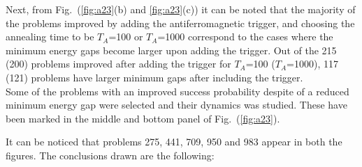 \documentclass[../main.tex]{subfiles}
\begin{document}
Next, from Fig.~(\ref{fig:a23}(b) and \ref{fig:a23}(c)) it can be noted that the majority of the problems improved by adding the antiferromagnetic trigger, and choosing the annealing time to be $T_A$=100 or $T_A$=1000 correspond to the cases where the minimum energy gaps become larger upon adding the trigger. Out of the 215 (200) problems improved after adding the trigger for $T_A$=100 ($T_A$=1000), 117 (121) problems have larger minimum gaps after including the trigger.\\
Some of the problems with an improved success probability despite of a reduced minimum energy gap were selected and their dynamics was studied. These have been marked in the middle and bottom panel of Fig.~(\ref{fig:a23}). 

It can be noticed that problems 275, 441, 709, 950 and 983 appear in both the figures. The conclusions drawn are the following:
\end{document}
